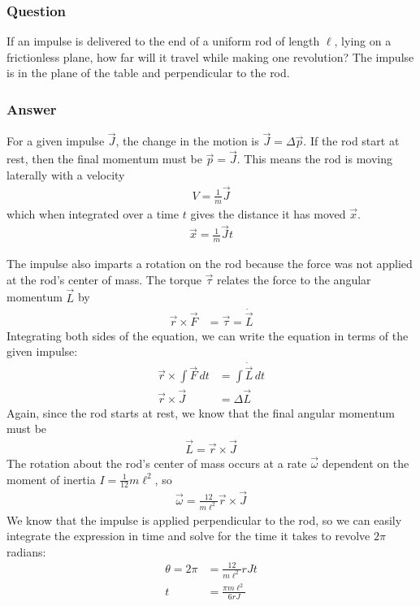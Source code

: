 \subsubsection{Question}

If an impulse is delivered to the end of a uniform rod of length $\ell $, lying on
a frictionless plane, how far will it travel while making one revolution? The
impulse is in the plane of the table and perpendicular to the rod.

\subsubsection{Answer}

For a given impulse $\vec J$, the change in the motion is $\vec J = \Delta \vec p$.
If the rod start at rest, then the final momentum must be $\vec p = \vec J$.
This means the rod is moving laterally with a velocity
\begin{align*}
    V = \frac 1m \vec J
\end{align*}
which when integrated over a time $t$ gives the distance it has moved $\vec x$.
\begin{align*}
    \vec x = \frac 1m \vec J t
\end{align*}

The impulse also imparts a rotation on the rod because the force was not
applied at the rod's center of mass. The torque $\vec \tau$ relates the force
to the angular momentum $\vec L$ by
\begin{align*}
    \vec r \times  \vec F &= \vec \tau = \dot{\vec L}
\end{align*}
Integrating both sides of the equation, we can write the equation in terms of
the given impulse:
\begin{align*}
    \vec r \times  \int \vec F \,dt &= \int \dot{\vec L} \,dt \\
    \vec r \times  \vec J &= \Delta \vec L
\end{align*}
Again, since the rod starts at rest, we know that the final angular momentum
must be
\begin{align*}
    \vec{L} = \vec{r} \times \vec{J}
\end{align*}
The rotation about the rod's center of mass  occurs at a rate $\vec {\omega}$
dependent on the moment of inertia $I = \frac{1}{12} m\ell ^2$, so
\begin{align*}
    \vec {\omega} = \frac{12}{m\ell^2} \vec{r} \times \vec{J}
\end{align*}
We know that the impulse is applied perpendicular to the rod, so we can easily
integrate the expression in time and solve for the time it takes to revolve
$2{\pi}$ radians:
\begin{align*}
    \theta  = 2{\pi} &= \frac{12}{m\ell ^2} rJt \\
    t &= \frac{{\pi} m\ell ^2}{6 rJ}
\end{align*}


